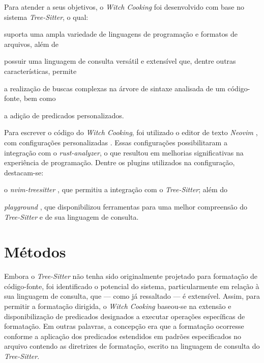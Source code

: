 \documentclass
  [11pt,a4paper,english,brazil,openright,sumario=tradicional,twoside]
  {abntex2}
\newcommand{\treesitter}{\textit{Tree-Sitter}\xspace}
\newcommand{\witchcooking}{\textit{Witch Cooking}\xspace}
\begin{document}
  Para atender a seus objetivos, o \witchcooking foi desenvolvido com base no
  sistema \treesitter \cite{tree-sitter-2023-tree}, o qual:
  \begin{inparaenum}
    \item suporta uma ampla variedade de linguagens de programação e formatos
          de arquivos, além de
    \item possuir uma linguagem de consulta versátil e extensível que, dentre
          outras características, permite
          \begin{inparaenum}
            \item a realização de buscas complexas na árvore de sintaxe
                  analisada de um código-fonte, bem como
            \item a adição de predicados personalizados.
          \end{inparaenum}
  \end{inparaenum}

  Para escrever o código do \witchcooking, foi utilizado o editor de texto
  \textit{Neovim} \cite{neovim-2023-hyperextensible}, com configurações
  personalizadas \cite{silva-2023-uma}. Essas configurações possibilitaram a
  integração com o \textit{rust-analyzer}, o que resultou em melhorias
  significativas na experiência de programação. Dentre os plugins utilizados na
  configuração, destacam-se:
  \begin{inparaenum}
    \item o \textit{nvim-treesitter} \cite{nvim-treesitter-2023-nvim}, que
          permitiu a integração com o \treesitter; além do
    \item \textit{playground} \cite{nvim-treesitter-2023-playground}, que
          disponibilizou ferramentas para uma melhor compreensão do \treesitter
          e de sua linguagem de consulta.
  \end{inparaenum}


  \section{Métodos}

  Embora o \treesitter não tenha sido originalmente projetado para formatação
  de código-fonte, foi identificado o potencial do sistema, particularmente em
  relação à sua linguagem de consulta, que --- como já ressaltado --- é
  extensível. Assim, para permitir a formatação dirigida, o \witchcooking
  baseou-se na extensão e disponibilização de predicados designados a executar
  operações específicas de formatação. Em outras palavras, a concepção era que
  a formatação ocorresse conforme a aplicação dos predicados estendidos em
  padrões especificados no arquivo contendo as diretrizes de formatação,
  escrito na linguagem de consulta do \treesitter.
\end{document}
